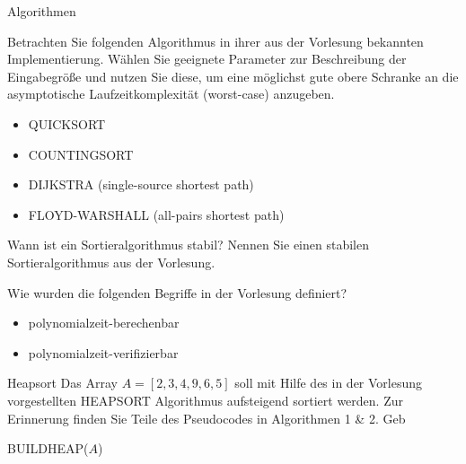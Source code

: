 \documentclass{article}
\begin{document}
\begin{exercises}{Algorithmen}
\item Betrachten Sie folgenden Algorithmus in ihrer aus der Vorlesung bekannten Implementierung. Wählen Sie geeignete Parameter zur Beschreibung der Eingabegröße und nutzen Sie diese, um eine möglichst gute obere Schranke an die asymptotische Laufzeitkomplexität (worst-case) anzugeben.
\begin{itemize}
  \item QUICKSORT
  \item COUNTINGSORT
  \item DIJKSTRA (single-source shortest path)
  \item FLOYD-WARSHALL (all-pairs shortest path)
\end{itemize}
\item Wann ist ein Sortieralgorithmus stabil? Nennen Sie einen stabilen Sortieralgorithmus aus der Vorlesung.
\item Wie wurden die folgenden Begriffe in der Vorlesung definiert?
\begin{itemize}
  \item polynomialzeit-berechenbar
  \item polynomialzeit-verifizierbar
\end{itemize}
\end{exercises}

\begin{exercise}{Heapsort}
  Das Array $A = [2,3,4,9,6,5]$ soll mit Hilfe des in der Vorlesung vorgestellten HEAPSORT Algorithmus aufsteigend sortiert werden. Zur Erinnerung finden Sie Teile des Pseudocodes in Algorithmen 1 \& 2. Geb
  \begin{algorithm}[ht]
    \caption{HEAPSORT($A$)}
    BUILDHEAP($A$) \\
  \end{algorithm}
\end{exercise}
\end{document}
